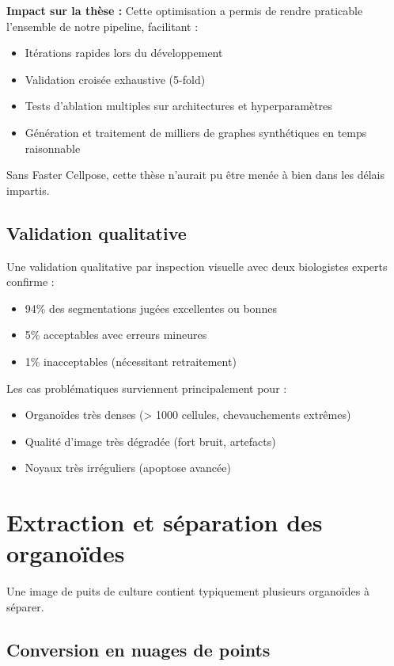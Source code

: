 \textbf{Impact sur la thèse :}
Cette optimisation a permis de rendre praticable l'ensemble de notre pipeline, facilitant :
\begin{itemize}
    \item Itérations rapides lors du développement
    \item Validation croisée exhaustive (5-fold)
    \item Tests d'ablation multiples sur architectures et hyperparamètres
    \item Génération et traitement de milliers de graphes synthétiques en temps raisonnable
\end{itemize}

Sans Faster Cellpose, cette thèse n'aurait pu être menée à bien dans les délais impartis.

\subsection{Validation qualitative}

Une validation qualitative par inspection visuelle avec deux biologistes experts confirme :
\begin{itemize}
    \item 94\% des segmentations jugées excellentes ou bonnes
    \item 5\% acceptables avec erreurs mineures
    \item 1\% inacceptables (nécessitant retraitement)
\end{itemize}

Les cas problématiques surviennent principalement pour :
\begin{itemize}
    \item Organoïdes très denses (> 1000 cellules, chevauchements extrêmes)
    \item Qualité d'image très dégradée (fort bruit, artefacts)
    \item Noyaux très irréguliers (apoptose avancée)
\end{itemize}

\section{Extraction et séparation des organoïdes}

Une image de puits de culture contient typiquement plusieurs organoïdes à séparer.

\subsection{Conversion en nuages de points}

